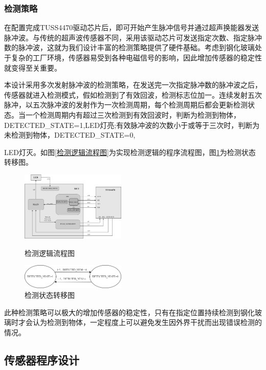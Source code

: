     \subsubsection{检测策略}
      在配置完成TUSS4470驱动芯片后，即可开始产生脉冲信号并通过超声换能器发送脉冲波。与传统的超声波传感器不同，采用该驱动芯片可发送指定次数、指定脉冲数的脉冲波，这就为我们设计丰富的检测策略提供了硬件基础。考虑到钢化玻璃处于复杂的工厂环境，传感器易受到各种电磁信号的影响，因此增加传感器的稳定性就变得至关重要。\par
      本设计采用多次发射脉冲波的检测策略，在发送完一次指定脉冲数的脉冲波之后，传感器就进入检测模式，假如检测到了有效回波，检测标志位加一。连续发射五次脉冲，以五次脉冲波的发射作为一次检测周期，每个检测周期后都会更新检测状态。当一个检测周期内有超过三次检测到有效回波时，判断为检测到物体，DETECTED\_STATE=1,LED灯亮;有效脉冲波的次数小于或等于三次时，判断为未检测到物体，DETECTED\_STATE=0,\par\noindent LED灯灭。如图\ref{检测逻辑流程图}为实现检测逻辑的程序流程图，图\ref{检测状态转移图}为检测状态转移图。
     \begin{figure}[ht]
      \begin{minipage}{0.5\linewidth}
		\centering
		\includegraphics[width=5cm]{figure/Overall program block diagram.png}
		\caption{检测逻辑流程图}
		\label{检测逻辑流程图}%
	\end{minipage}
	\begin{minipage}{0.4\linewidth}
		\centering
		\includegraphics[width=5cm]{figure/LED state transition diagram.png}
		\caption{检测状态转移图}
		\label{检测状态转移图}%
	\end{minipage}
\end{figure}
    此种检测策略可以极大的增加传感器的稳定性，只有在指定位置持续检测到钢化玻璃时才会认为检测到物体，一定程度上可以避免发生因外界干扰而出现错误检测的情况。
 
      
    
    \subsection{传感器程序设计}
